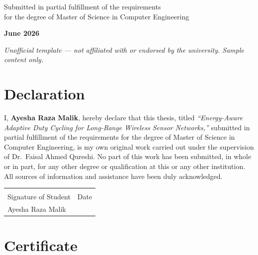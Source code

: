 \documentclass[12pt,a4paper]{report}
\begin{document}
\begin{titlepage}
\begin{center}
\vspace{24pt}

{\normalsize\color{nustslate}
Submitted in partial fulfillment of the requirements\\
for the degree of Master of Science in Computer Engineering}

\vspace{18pt}
{\normalsize\bfseries\color{nustgreen} June 2026}

\vfill

\begin{goldrule}
\centering
\footnotesize\itshape
Unofficial template --- not affiliated with or endorsed by the university.
Sample content only.
\end{goldrule}

\end{center}
\end{titlepage}

\chapter*{Declaration}
\thispagestyle{plain}

\noindent I, \textbf{Ayesha Raza Malik}, hereby declare that this thesis, titled
\emph{``Energy-Aware Adaptive Duty Cycling for Long-Range Wireless Sensor Networks,''}
submitted in partial fulfillment of the requirements for the degree of Master of Science in
Computer Engineering, is my own original work carried out under the supervision of
Dr.\ Faisal Ahmed Qureshi. No part of this work has been submitted, in whole or in part, for
any other degree or qualification at this or any other institution. All sources of information
and assistance have been duly acknowledged.

\vspace{50pt}

\begin{tabular}{@{}p{7cm}p{7cm}@{}}
\dotfill & \dotfill \\
Signature of Student & Date \\[4pt]
Ayesha Raza Malik &  \\
\end{tabular}

\chapter*{Certificate}
\thispagestyle{plain}
\end{document}
